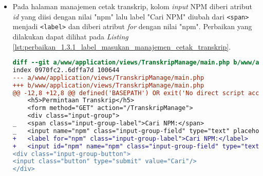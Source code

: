 \begin{itemize}
\item Pada halaman manajemen cetak transkrip, kolom \textit{input} NPM diberi atribut \textit{id} yang diisi dengan nilai "npm" lalu label "Cari NPM" diubah dari \texttt{<span>} menjadi \texttt{<label>} dan diberi atribut \textit{for} dengan nilai "npm". Perbaikan yang dilakukan dapat dilihat pada \textit{Listing} \ref{lst:perbaikan_1.3.1_label_masukan_manajemen_cetak_transkrip}.
\begin{lstlisting}[frame=single, label={lst:perbaikan_1.3.1_label_masukan_manajemen_cetak_transkrip}, language=diff, caption=Perbaikan Kriteria Sukses 1.3.1 pada Kolom \textit{Input} di Halaman Manajemen Cetak Transkrip]
diff --git a/www/application/views/TranskripManage/main.php b/www/application/views/TranskripManage/main.php
index 0970fc2..6dffa7d 100644
--- a/www/application/views/TranskripManage/main.php
+++ b/www/application/views/TranskripManage/main.php
@@ -12,8 +12,8 @@ defined('BASEPATH') OR exit('No direct script access allowed');
    <h5>Permintaan Transkrip</h5>
    <form method="GET" action="/TranskripManage">
    <div class="input-group">
_   <span class="input-group-label">Cari NPM:</span>
_   <input name="npm" class="input-group-field" type="text" placeholder="2013730013" maxlength="10" minlength="10"<?= $npmQuery === NULL ? '' : " value='$npmQuery'" ?>/>
+   <label for="npm" class="input-group-label">Cari NPM:</label>
+   <input id="npm" name="npm" class="input-group-field" type="text" placeholder="2013730013" maxlength="10" minlength="10"<?= $npmQuery === NULL ? '' : " value='$npmQuery'" ?>/>
<div class="input-group-button">
<input class="button" type="submit" value="Cari"/>
</div>
\end{lstlisting}


\end{itemize}
